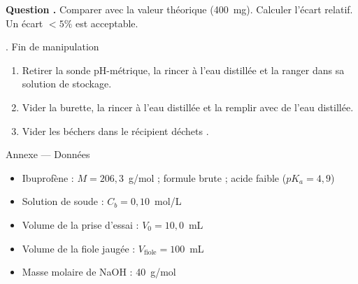 \documentclass[11pt,a4paper]{article}
\newcommand{\sectitle}[1]{%
  \vspace{6pt}
  \noindent\colorbox{exoheader}{\parbox{\dimexpr\linewidth-2\fboxsep}%
    {\color{white}\bfseries\large\strut\quad #1}}
  \vspace{4pt}
}
\newcommand{\subsectitle}[1]{%
  \vspace{4pt}
  \noindent\colorbox{exolight}{\parbox{\dimexpr\linewidth-2\fboxsep}%
    {\color{exoheader}\bfseries\strut\quad #1}}
  \vspace{2pt}
}
\newcounter{question}
\newcommand{\question}{%
  \stepcounter{question}%
  \noindent\textcolor{exoheader}{\textbf{Question \thequestion.}}\quad
}
\begin{document}
\vspace{4pt}
\question Comparer avec la valeur théorique (400~mg). Calculer l'écart relatif.
Un écart $< 5\%$ est acceptable.

\vspace{0.3cm}\noindent\dotfill

\vspace{0.3cm}\noindent\dotfill

\vspace{4pt}
\subsectitle{4. Fin de manipulation}

\begin{enumerate}[leftmargin=1.5cm, label=\textcolor{exoheader}{\textbf{\arabic*.}}]
  \item Retirer la sonde pH-métrique, la rincer à l'eau distillée et la ranger dans sa solution de stockage.
  \item Vider la burette, la rincer à l'eau distillée et la remplir avec de l'eau distillée.
  \item Vider les béchers dans le récipient \og déchets \fg{}.
\end{enumerate}

\newpage
\sectitle{Annexe --- Données}

\vspace{4pt}
\begin{mdframed}[backgroundcolor=exolight, linecolor=exoheader, linewidth=1.2pt]
\begin{itemize}
  \item Ibuprofène : $M = 206{,}3$~g/mol ; formule brute  ; acide faible ($pK_a = 4{,}9$)
  \item Solution de soude : $C_b = 0{,}10$~mol/L
  \item Volume de la prise d'essai : $V_0 = 10{,}0$~mL
  \item Volume de la fiole jaugée : $V_{\text{fiole}} = 100$~mL
  \item Masse molaire de NaOH : 40~g/mol
\end{itemize}
\end{mdframed}
\end{document}
